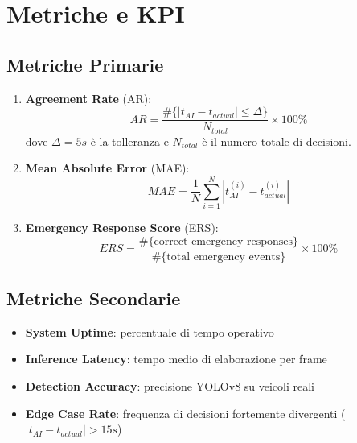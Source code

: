 \documentclass[a4paper,11pt]{article}
\begin{document}
\section{Metriche e KPI}

\subsection{Metriche Primarie}

\begin{enumerate}
    \item \textbf{Agreement Rate} (AR):
    \begin{equation}
        AR = \frac{\#\{|t_{AI} - t_{actual}| \leq \Delta\}}{N_{total}} \times 100\%
    \end{equation}
    dove $\Delta = 5s$ è la tolleranza e $N_{total}$ è il numero totale di decisioni.
    
    \item \textbf{Mean Absolute Error} (MAE):
    \begin{equation}
        MAE = \frac{1}{N} \sum_{i=1}^{N} |t_{AI}^{(i)} - t_{actual}^{(i)}|
    \end{equation}
    
    \item \textbf{Emergency Response Score} (ERS):
    \begin{equation}
        ERS = \frac{\#\{\text{correct emergency responses}\}}{\#\{\text{total emergency events}\}} \times 100\%
    \end{equation}
\end{enumerate}

\subsection{Metriche Secondarie}

\begin{itemize}
    \item \textbf{System Uptime}: percentuale di tempo operativo
    \item \textbf{Inference Latency}: tempo medio di elaborazione per frame
    \item \textbf{Detection Accuracy}: precisione YOLOv8 su veicoli reali
    \item \textbf{Edge Case Rate}: frequenza di decisioni fortemente divergenti ($|t_{AI} - t_{actual}| > 15s$)
\end{itemize}
\end{document}
